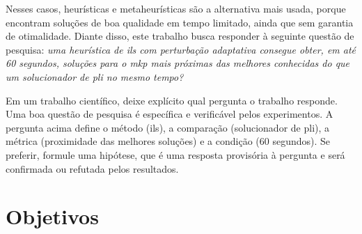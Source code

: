 Nesses casos, heurísticas e metaheurísticas são a alternativa mais usada,
porque encontram soluções de boa qualidade em tempo limitado, ainda que sem
garantia de otimalidade. Diante disso, este trabalho busca responder à
seguinte questão de pesquisa: \emph{uma heurística de \ac{ils} com perturbação
adaptativa consegue obter, em até 60 segundos, soluções para o \acs{mkp} mais
próximas das melhores conhecidas do que um solucionador de \acs{pli} no mesmo
tempo?}

\begin{instrucao}
Em um trabalho científico, deixe explícito qual pergunta o trabalho responde.
Uma boa questão de pesquisa é específica e verificável pelos experimentos. A
pergunta acima define o método (\acs{ils}), a comparação (solucionador de
\acs{pli}), a métrica (proximidade das melhores soluções) e a condição (60
segundos). Se preferir, formule uma hipótese, que é uma resposta provisória à
pergunta e será confirmada ou refutada pelos resultados.
\end{instrucao}

\section{Objetivos}
\label{sec:introducao:objetivos}

